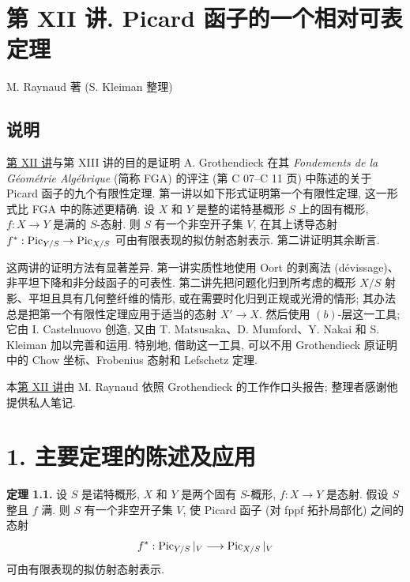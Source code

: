 \section*{第 XII 讲. Picard 函子的一个相对可表定理}
\begin{center}
M. Raynaud 著 (S. Kleiman 整理)
\end{center}

\subsection*{说明}

\hyperlink{sga6.e12.expose}{第 XII 讲}与第 XIII 讲的目的是证明 A. Grothendieck 在其 \emph{Fondements de la G\'eom\'etrie Alg\'ebrique} (简称 FGA) 的评注 (第 C 07--C 11 页) 中陈述的关于 Picard 函子的九个有限性定理. 第一讲以如下形式证明第一个有限性定理, 这一形式比 FGA 中的陈述更精确. 设 $X$ 和 $Y$ 是整的诺特基概形 $S$ 上的固有概形, $f:X\to Y$ 是满的 $S$-态射. 则 $S$ 有一个非空开子集 $V$, 在其上诱导态射 $f^*:\operatorname{Pic}_{Y/S}\to\operatorname{Pic}_{X/S}$ 可由有限表现的拟仿射态射表示. 第二讲证明其余断言.

这两讲的证明方法有显著差异. 第一讲实质性地使用 Oort 的剥离法 (d\'evissage)、非平坦下降和非分歧函子的可表性. 第二讲先把问题化归到所考虑的概形 $X/S$ 射影、平坦且具有几何整纤维的情形, 或在需要时化归到正规或光滑的情形; 其办法总是把第一个有限性定理应用于适当的态射 $X'\to X$. 然后使用 $(b)$-层这一工具; 它由 I. Castelnuovo 创造, 又由 T. Matsusaka、D. Mumford、Y. Nakai 和 S. Kleiman 加以完善和运用. 特别地, 借助这一工具, 可以不用 Grothendieck 原证明中的 Chow 坐标、Frobenius 态射和 Lefschetz 定理.

本\hyperlink{sga6.e12.expose}{第 XII 讲}由 M. Raynaud 依照 Grothendieck 的工作作口头报告; 整理者感谢他提供私人笔记.

\section*{1. 主要定理的陈述及应用}

\textbf{定理 1.1.} 设 $S$ 是诺特概形, $X$ 和 $Y$ 是两个固有 $S$-概形, $f:X\to Y$ 是态射. 假设 $S$ 整且 $f$ 满. 则 $S$ 有一个非空开子集 $V$, 使 Picard 函子 (对 fppf 拓扑局部化) 之间的态射
\[
  f^*:\operatorname{Pic}_{Y/S}|_V\longrightarrow\operatorname{Pic}_{X/S}|_V
\]
可由有限表现的拟仿射态射表示.

